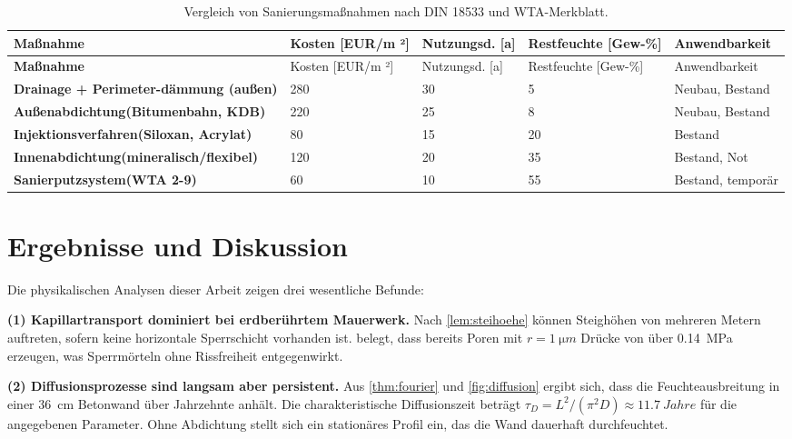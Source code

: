 ﻿\documentclass[a4paper,12pt]{article}
\theoremstyle{definition}
\begin{document}
\begin{longtable}{>{\bfseries}p{3.2cm}p{1.8cm}p{1.8cm}p{2.0cm}p{2.5cm}}
  \caption{Vergleich von Sanierungsma\ss{}nahmen nach DIN 18533 und WTA-Merkblatt.}
  \label{tab:massnahmen}\\
  \toprule
  Ma\ss{}nahme & Kosten [EUR/m ²] & Nutzungsd. [a] & Restfeuchte [Gew-\%] & Anwendbarkeit \\
  \midrule
  \endfirsthead
  \toprule
  Ma\ss{}nahme & Kosten [EUR/m ²] & Nutzungsd. [a] & Restfeuchte [Gew-\%] & Anwendbarkeit \\
  \midrule
  \endhead
  \bottomrule
  \endfoot
  Drainage + Perimeter-\newline d\"ammung (au\ss{}en) & 280 & 30 & 5 & Neubau, Bestand \\
  Au\ss{}enabdichtung\newline (Bitumenbahn, KDB) & 220 & 25 & 8 & Neubau, Bestand \\
  Injektionsverfahren\newline (Siloxan, Acrylat) & 80 & 15 & 20 & Bestand \\
  Innenabdichtung\newline (mineralisch/flexibel) & 120 & 20 & 35 & Bestand, Not \\
  Sanierputzsystem\newline (WTA 2-9) & 60 & 10 & 55 & Bestand, tempor\"ar \\
\end{longtable}

\section{Ergebnisse und Diskussion}
\label{sec:ergebnisse}

Die physikalischen Analysen dieser Arbeit zeigen drei wesentliche Befunde:

\textbf{(1) Kapillartransport dominiert bei erdber\"uhrtem Mauerwerk.}
Nach \cref{lem:steihoehe} k\"onnen Steigh\"ohen von mehreren Metern
auftreten, sofern keine horizontale Sperrschicht vorhanden ist.
 belegt, dass bereits Poren mit
$r = \SI{1}{\micro m}$ Dr\"ucke von \"uber \SI{0.14}{MPa} erzeugen,
was Sperrm\"orteln ohne Rissfreiheit entgegenwirkt.

\textbf{(2) Diffusionsprozesse sind langsam aber persistent.}
Aus \cref{thm:fourier} und \cref{fig:diffusion} ergibt sich,
dass die Feuchteausbreitung in einer \SI{36}{cm} Betonwand \"uber
Jahrzehnte anh\"alt. Die charakteristische Diffusionszeit betr\"agt
$\tau_D = L^2/(\pi^2 D) \approx \SI{11.7}{Jahre}$ f\"ur die angegebenen
Parameter. Ohne Abdichtung stellt sich ein station\"ares Profil ein,
das die Wand dauerhaft durchfeuchtet.
\end{document}
